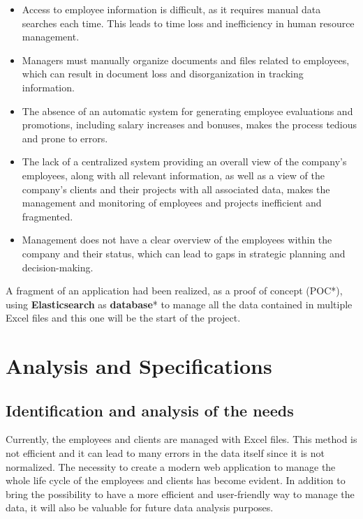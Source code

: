\documentclass[12pt,a4paper,table,english]{article}
\begin{document}
	\begin{itemize}
	
		\item Access to employee information is difficult, as it requires manual data searches each time. This leads to time loss and inefficiency in human resource management.
	
		\item Managers must manually organize documents and files related to employees, which can result in document loss and disorganization in tracking information.
	
		\item The absence of an automatic system for generating employee evaluations and promotions, including salary increases and bonuses, makes the process tedious and prone to errors.
	
		\item The lack of a centralized system providing an overall view of the company’s employees, along with all relevant information, as well as a view of the company’s clients and their projects with all associated data, makes the management and monitoring of employees and projects inefficient and fragmented.
	
		\item Management does not have a clear overview of the employees within the company and their status, which can lead to gaps in strategic planning and decision-making.
	
	\end{itemize}


	A fragment of an application had been realized, as a proof of concept (POC*), using \textbf{Elasticsearch} as \textbf{database}* to manage all the data contained in multiple Excel files and this one will be the start of the project.\\
	
	\newpage
	
	
	\section{Analysis and Specifications}
	
	\subsection{Identification and analysis of the needs}
	Currently, the employees and clients are managed with Excel files. This method is not efficient and it can lead to many errors in the data itself since it is not normalized. The necessity to create a modern web application to manage the whole life cycle of the employees and clients has become evident. In addition to bring the possibility to have a more efficient and user-friendly way to manage the data, it will also be valuable for future data analysis purposes.\\
	
\end{document}
